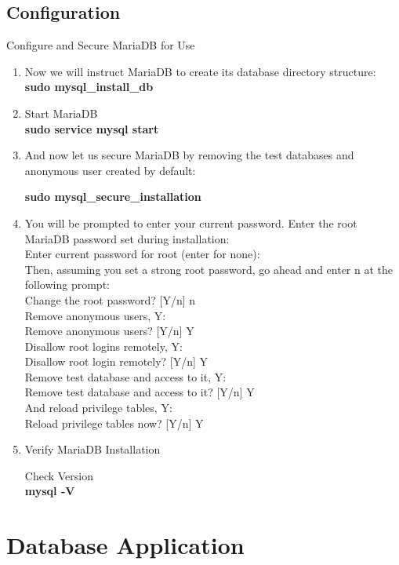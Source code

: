\documentclass[journal,12pt,twocolumn]{IEEEtran}
\begin{document}
\subsection{Configuration}
Configure and Secure MariaDB for Use
\begin{enumerate}
\item 

Now we will instruct MariaDB to create its database directory structure:
\\
\textbf{sudo mysql\_install\_db}

\item Start MariaDB
\\
\textbf{sudo service mysql start}

\item And now let us secure MariaDB by removing the test databases and anonymous user created by default:

\textbf{sudo mysql\_secure\_installation}

\item You will be prompted to enter your current password. Enter the root MariaDB password set during installation:
\\
Enter current password for root (enter for none):
\\
Then, assuming you set a strong root password, go ahead and enter n at the following prompt:
\\
Change the root password? [Y/n] n
\\
Remove anonymous users, Y:
\\
Remove anonymous users? [Y/n] Y
\\
Disallow root logins remotely, Y:
\\
Disallow root login remotely? [Y/n] Y
\\
Remove test database and access to it, Y:
\\
Remove test database and access to it? [Y/n] Y
\\
And reload privilege tables, Y:
\\
Reload privilege tables now? [Y/n] Y

\item Verify MariaDB Installation

 Check Version
\\
\textbf{mysql -V}
\end{enumerate}

\section{Database Application}
\end{document}
